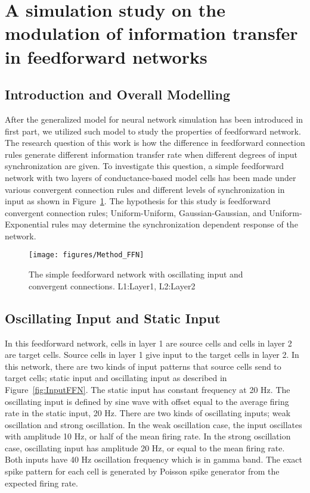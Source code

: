 \section{A simulation study on the modulation of information transfer in feedforward networks}

\subsection{Introduction and Overall Modelling}

After the generalized model for neural network simulation has been introduced in first part, we utilized such model to study the properties of feedforward network. The research question of this work is how the difference in feedforward connection rules generate different information transfer rate when different degrees of input synchronization are given. To investigate this question, a simple feedforward network with two layers of conductance-based model cells has been made under various convergent connection rules and different levels of synchronization in input as shown in Figure~\ref{fig:FFmodel}. The hypothesis for this study is feedforward convergent connection rules; Uniform-Uniform, Gaussian-Gaussian, and Uniform-Exponential rules may determine the synchronization dependent response of the network.
\begin{figure}[!h]
	\centering
	\texttt{[image: figures/Method\_FFN]}
	\caption{The simple feedforward network with oscillating input and convergent connections. L1:Layer1, L2:Layer2}
	\label{fig:FFmodel}
\end{figure} 

\subsection{Oscillating Input and Static Input}
 In this feedforward network, cells in layer 1 are source cells and cells in layer 2 are target cells. Source cells in layer 1 give input to the target cells in layer 2. In this network, there are two kinds of input patterns that source cells send to target cells; static input and oscillating input as described in Figure~\ref{fig:InputFFN}.  The static input has constant frequency at 20 Hz. The oscillating input is defined by sine wave with offset equal to the average firing rate in the static input, 20 Hz. There are two kinds of oscillating inputs; weak oscillation and strong oscillation. In the weak oscillation case, the input oscillates with amplitude 10 Hz, or half of the mean firing rate. In the strong oscillation case, oscillating input has amplitude 20 Hz, or equal to the mean firing rate. Both inputs have 40 Hz oscillation frequency which is in gamma band.  The exact spike pattern for each cell is generated by Poisson spike generator from the expected firing rate.

